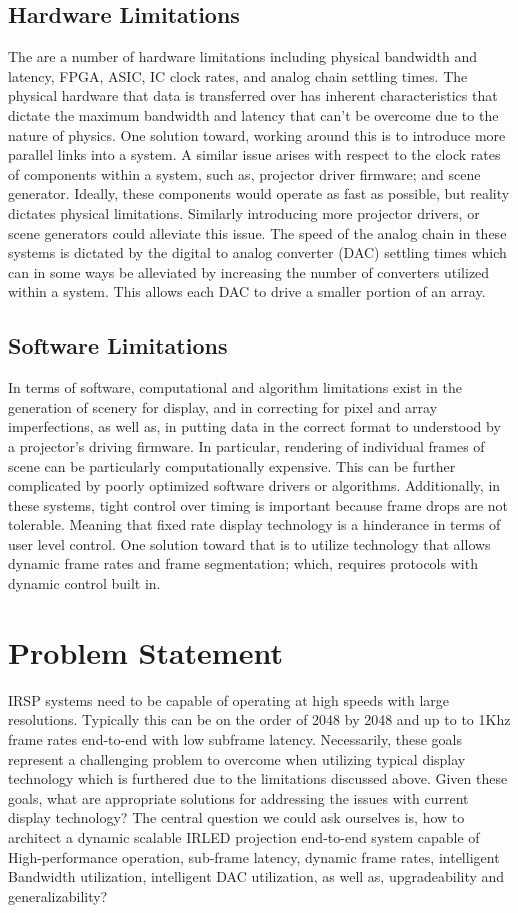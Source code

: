 \subsection{Hardware Limitations}
    The are a number of hardware limitations including physical bandwidth and latency, FPGA, ASIC, IC clock rates, and analog chain settling times. The physical hardware that data is transferred over has inherent characteristics that dictate the maximum bandwidth and latency that can't be overcome due to the nature of physics. One solution toward, working around this is to introduce more parallel links into a system. A similar issue arises with respect to the clock rates of components within a system, such as, projector driver firmware; and scene generator. Ideally, these components would operate as fast as possible, but reality dictates physical limitations. Similarly introducing more projector drivers, or scene generators could alleviate this issue. The speed of the analog chain in these systems is dictated by the digital to analog converter (DAC) settling times which can in some ways be alleviated by increasing the number of converters utilized within a system. This allows each DAC to drive a smaller portion of an array.

\subsection{Software Limitations}
    In terms of software, computational and algorithm limitations exist in the generation of scenery for display, and in correcting for pixel and array imperfections, as well as, in putting data in the correct format to understood by a projector's driving firmware. In particular, rendering of individual frames of scene can be particularly computationally expensive. This can be further complicated by poorly optimized software drivers or algorithms. Additionally, in these systems, tight control over timing is important because frame drops are not tolerable. Meaning that fixed rate display technology is a hinderance in terms of user level control. One solution toward that is to utilize technology that allows dynamic frame rates and frame segmentation; which, requires protocols with dynamic control built in.


\section{Problem Statement}
IRSP systems need to be capable of operating at high speeds with large resolutions. Typically this can be on the order of 2048 by 2048 and up to to 1Khz frame rates end-to-end with low subframe latency. Necessarily, these goals represent a challenging problem to overcome when utilizing typical display technology which is furthered due to the limitations discussed above. Given these goals, what are appropriate solutions for addressing the issues with current display technology? The central question we could ask ourselves is, how to architect a dynamic scalable IRLED projection end-to-end system capable of High-performance operation, sub-frame latency, dynamic frame rates, intelligent Bandwidth utilization, intelligent DAC utilization, as well as, upgradeability and generalizability?


